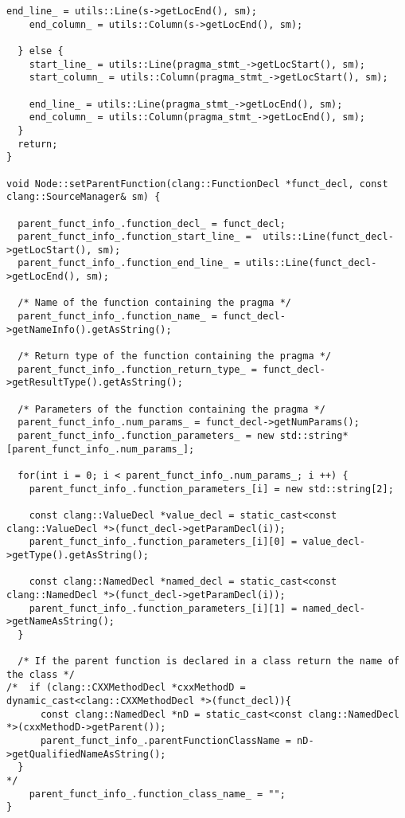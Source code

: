 \documentclass[a4paper,11pt,twoside]{book}
\begin{document}
\begin{lstlisting}[language=CCC, caption=pragma\_handler/Node.cpp]
    end_line_ = utils::Line(s->getLocEnd(), sm);
    end_column_ = utils::Column(s->getLocEnd(), sm);

  } else {
    start_line_ = utils::Line(pragma_stmt_->getLocStart(), sm);
    start_column_ = utils::Column(pragma_stmt_->getLocStart(), sm);

    end_line_ = utils::Line(pragma_stmt_->getLocEnd(), sm);
    end_column_ = utils::Column(pragma_stmt_->getLocEnd(), sm);
  }
  return;
}

void Node::setParentFunction(clang::FunctionDecl *funct_decl, const clang::SourceManager& sm) {
  
  parent_funct_info_.function_decl_ = funct_decl;
  parent_funct_info_.function_start_line_ =  utils::Line(funct_decl->getLocStart(), sm);
  parent_funct_info_.function_end_line_ = utils::Line(funct_decl->getLocEnd(), sm);
  
  /* Name of the function containing the pragma */
  parent_funct_info_.function_name_ = funct_decl->getNameInfo().getAsString();

  /* Return type of the function containing the pragma */
  parent_funct_info_.function_return_type_ = funct_decl->getResultType().getAsString();

  /* Parameters of the function containing the pragma */
  parent_funct_info_.num_params_ = funct_decl->getNumParams();
  parent_funct_info_.function_parameters_ = new std::string*[parent_funct_info_.num_params_];
  
  for(int i = 0; i < parent_funct_info_.num_params_; i ++) {
    parent_funct_info_.function_parameters_[i] = new std::string[2];
    
    const clang::ValueDecl *value_decl = static_cast<const clang::ValueDecl *>(funct_decl->getParamDecl(i));
    parent_funct_info_.function_parameters_[i][0] = value_decl->getType().getAsString();

    const clang::NamedDecl *named_decl = static_cast<const clang::NamedDecl *>(funct_decl->getParamDecl(i));            
    parent_funct_info_.function_parameters_[i][1] = named_decl->getNameAsString();
  }

  /* If the parent function is declared in a class return the name of the class */
/*  if (clang::CXXMethodDecl *cxxMethodD = dynamic_cast<clang::CXXMethodDecl *>(funct_decl)){
      const clang::NamedDecl *nD = static_cast<const clang::NamedDecl *>(cxxMethodD->getParent());            
      parent_funct_info_.parentFunctionClassName = nD->getQualifiedNameAsString();
  }
*/
    parent_funct_info_.function_class_name_ = "";
}


\end{lstlisting}
\end{document}
